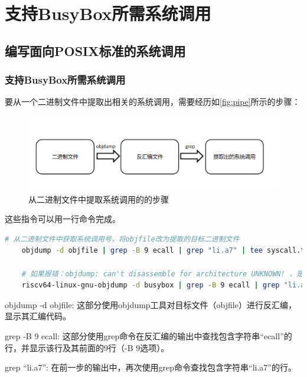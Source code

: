 \section{支持BusyBox所需系统调用}
\subsection{编写面向POSIX标准的系统调用}
\subsubsection{支持BusyBox所需系统调用}

要从一个二进制文件中提取出相关的系统调用，需要经历如\ref{fig:pipe}所示的步骤：

\begin{figure}[htb]
    \centering
    \includegraphics[width=\textwidth]{figures/09-03-系统调用抽取.png}
    \caption{
        从二进制文件中提取系统调用的的步骤
    }
    \label{fig:get_syscall}
\end{figure}

这些指令可以用一行命令完成。

\begin{lstlisting}[language=bash]
    # 从二进制文件中获取系统调用号，将objfile改为提取的目标二进制文件
    objdump -d objfile | grep -B 9 ecall | grep "li.a7" | tee syscall.txt

    # 如果报错：objdump: can't disassemble for architecture UNKNOWN! ，是由于当前的objdump并非RISC-V架构，尝试
    riscv64-linux-gnu-objdump -d busybox | grep -B 9 ecall | grep "li.a7" | tee syscall.txt

\end{lstlisting}

objdump -d objfile: 这部分使用objdump工具对目标文件（objfile）进行反汇编，显示其汇编代码。

grep -B 9 ecall: 这部分使用grep命令在反汇编的输出中查找包含字符串\enquote{ecall}的行，并显示该行及其前面的9行（-B 9选项）。

grep \enquote{li.a7}: 在前一步的输出中，再次使用grep命令查找包含字符串\enquote{li.a7}的行。

